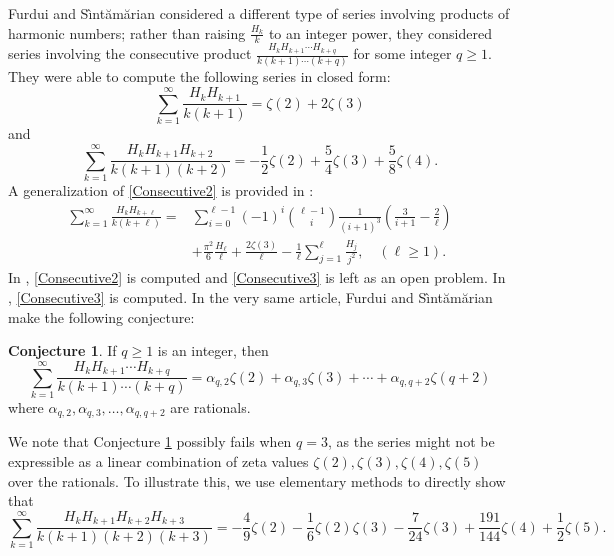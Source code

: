 \documentclass[10pt]{amsart}
\theoremstyle{definition}
\newtheorem{conjecture}{Conjecture}
\begin{document}
Furdui and S{\^\i}nt{\u{a}}m{\u{a}}rian considered a different type of series involving products of harmonic numbers; rather than raising $\frac{H_k}{k}$ to an integer power, they considered series involving the consecutive product $\frac{H_k H_{k+1} \cdots H_{k+q}}{k(k+1)\cdots(k+q)}$ for some integer $q \geq 1$. They were able to compute the following series in closed form:
\begin{equation} \label{Consecutive2}
    \sum_{k=1}^\infty \frac{H_k H_{k+1}}{k(k+1)} = \zeta(2) + 2\zeta(3)
\end{equation}
and
\begin{equation} \label{Consecutive3}
    \sum_{k=1}^\infty \frac{H_k H_{k+1} H_{k+2}}{k(k+1)(k+2)} = -\frac{1}{2}\zeta(2) + \frac{5}{4}\zeta(3) + \frac{5}{8}\zeta(4).
\end{equation}
A generalization of \eqref{Consecutive2} is provided in \cite{FurduiProduct2Series}:
\begin{align*}
    \sum_{k=1}^\infty \frac{H_k H_{k+\ell}}{k(k+\ell)}
    =& \sum_{i=0}^{\ell-1} (-1)^i \binom{\ell-1}{i}\frac{1}{(i+1)^3}\left(\frac{3}{i+1} - \frac{2}{\ell}\right)\\
    &+ \frac{\pi^2}{6}\frac{H_\ell}{\ell} + \frac{2\zeta(3)}{\ell} - \frac{1}{\ell}\sum_{j=1}^{\ell} \frac{H_j}{j^2},\quad (\ell \geq 1).
\end{align*}
In \cite[p. 119]{SharpMathAnal}, \eqref{Consecutive2} is computed and \eqref{Consecutive3} is left as an open problem. In \cite{FurduiGazetaMat}, \eqref{Consecutive3} is computed. In the very same article, Furdui and S{\^\i}nt{\u{a}}m{\u{a}}rian make the following conjecture:
\begin{conjecture}\label{FurduiSintConjecture}
    If $q \geq 1$ is an integer, then
    $$\sum_{k=1}^\infty \frac{H_k H_{k+1}\cdots H_{k+q}}{k(k+1)\cdots (k+q)} = \alpha_{q,2}\zeta(2) + \alpha_{q, 3}\zeta(3) + \cdots + \alpha_{q, q+2} \zeta(q+2)$$
    where $\alpha_{q,2}, \alpha_{q,3}, \ldots, \alpha_{q, q+2}$ are rationals.
\end{conjecture}
We note that Conjecture \ref{FurduiSintConjecture} possibly fails when $q=3$, as the series might not be expressible as a linear combination of zeta values $\zeta(2), \zeta(3), \zeta(4), \zeta(5)$ over the rationals. To illustrate this, we use elementary methods to directly show that
$$\sum_{k=1}^\infty \frac{H_k H_{k+1} H_{k+2} H_{k+3}}{k(k+1)(k+2)(k+3)} = -\frac{4}{9} \zeta (2)-\frac{1}{6}\zeta (2) \zeta (3)-\frac{7}{24} \zeta (3)+\frac{191}{144} \zeta (4)+\frac{1}{2}\zeta (5).$$
\end{document}
